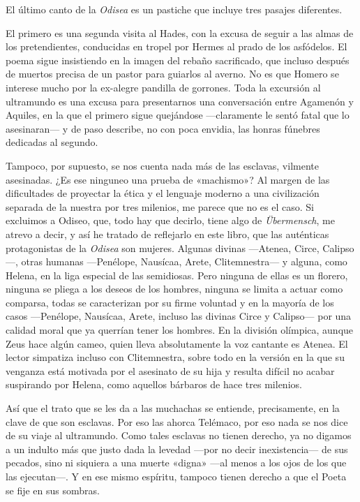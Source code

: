\label{cap:homero}

El último canto de la \emph{Odisea} es un pastiche que incluye tres pasajes diferentes.

El primero es una segunda visita al Hades, con la excusa de seguir a las almas de los pretendientes, conducidas en tropel por Hermes al prado de los asfódelos. El poema sigue insistiendo en la imagen del rebaño sacrificado, que incluso después de muertos precisa de un pastor para guiarlos al averno. No es que Homero se interese mucho por la ex-alegre pandilla de gorrones. Toda la excursión al ultramundo es una excusa para presentarnos una conversación entre Agamenón y Aquiles, en la que el primero sigue quejándose ---claramente le sentó fatal que lo asesinaran--- y de paso describe, no con poca envidia, las honras fúnebres dedicadas al segundo.

Tampoco, por supuesto, se nos cuenta nada más de las esclavas, vilmente asesinadas. ¿Es ese ninguneo una prueba de «machismo»? Al margen de las dificultades de proyectar la ética y el lenguaje moderno a una civilización separada de la nuestra por tres milenios, me parece que no es el caso. Si excluimos a Odiseo, que, todo hay que decirlo, tiene algo de \emph{Übermensch}, me atrevo a decir, y así he tratado de reflejarlo en este libro, que las auténticas protagonistas de la \emph{Odisea} son mujeres. Algunas divinas ---Atenea, Circe, Calipso---, otras humanas ---Penélope, Nausícaa, Arete, Clitemnestra--- y alguna, como Helena, en la liga especial de las semidiosas. Pero ninguna de ellas es un florero, ninguna se pliega a los deseos de los hombres, ninguna se limita a actuar como comparsa, todas se caracterizan por su firme voluntad y en la mayoría de los casos ---Penélope, Nausícaa, Arete, incluso las divinas Circe y Calipso--- por una calidad moral que ya querrían tener los hombres. En la división olímpica, aunque Zeus hace algún cameo, quien lleva absolutamente la voz cantante es Atenea. El lector simpatiza incluso con Clitemnestra, sobre todo en la versión en la que su venganza está motivada por el asesinato de su hija y resulta difícil no acabar suspirando por Helena, como aquellos bárbaros de hace tres milenios.

Así que el trato que se les da a las muchachas se entiende, precisamente, en la clave de que son esclavas. Por eso las ahorca Telémaco, por eso nada se nos dice de su viaje al ultramundo. Como tales esclavas no tienen derecho, ya no digamos a un indulto más que justo dada la levedad ---por no decir inexistencia--- de sus pecados, sino ni siquiera a una muerte «digna» ---al menos a los ojos de los que las ejecutan---. Y en ese mismo espíritu, tampoco tienen derecho a que el Poeta se fije en sus sombras.

